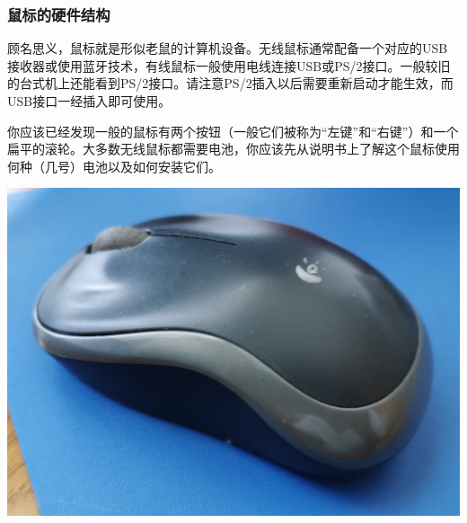 \subsubsection{鼠标的硬件结构}
顾名思义，鼠标就是形似老鼠的计算机设备。无线鼠标通常配备一个对应的USB接收器或使用蓝牙技术，有线鼠标一般使用电线连接USB或PS/2接口。一般较旧的台式机上还能看到PS/2接口。请注意PS/2插入以后需要重新启动才能生效，而USB接口一经插入即可使用。\par
你应该已经发现一般的鼠标有两个按钮（一般它们被称为“左键”和“右键”）和一个扁平的滚轮。大多数无线鼠标都需要电池，你应该先从说明书上了解这个鼠标使用何种（几号）电池以及如何安装它们。
\begin{center}
	\includegraphics[scale=0.05]{pic/Mouse}
\end{center}\par
